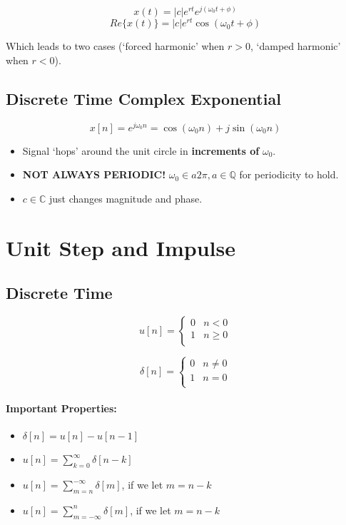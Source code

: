 \documentclass[a4paper,12pt]{report}
\begin{document}
$$x(t) = |c|e^{rt} e^{j(\omega_0 t + \phi)}$$
$$Re\{x(t)\} = |c|e^{rt} \cos(\omega_0 t + \phi)$$

Which leads to two cases (`forced harmonic' when $r>0$, `damped harmonic' when $r < 0$).

\subsection{Discrete Time Complex Exponential} 

$$x[n] = e^{j\omega_0 n} = \cos(\omega_0 n) + j\sin(\omega_0 n)$$

\begin{itemize}
\item Signal `hops' around the unit circle in \textbf{increments of} $\omega_0$.
\item \textbf{NOT ALWAYS PERIODIC!} $\omega_0 \in a2\pi, a\in \mathbb{Q}$ for periodicity to hold.
\item $c\in\mathbb{C}$ just changes magnitude and phase.
\end{itemize}

\section{Unit Step and Impulse}

\subsection{Discrete Time}

\begin{equation}
	u[n] = 
	\begin{cases}
		0 & n < 0 \\
		1 & n \geq 0 \\
	\end{cases}
\end{equation}

\begin{equation}
	\delta[n] = 
	\begin{cases}
		0 & n \neq 0 \\
		1 & n = 0 \\
	\end{cases}
\end{equation}


\paragraph{Important Properties: } 
\begin{itemize}
\item $\delta[n] = u[n] - u[n-1]$
\item $u[n] = \sum_{k=0}^\infty \delta[n-k]$
\item $u[n] = \sum_{m=n}^{-\infty} \delta[m]$, if we let $m = n-k$
\item $u[n] = \sum_{m=-\infty}^n \delta[m]$, if we let $m = n-k$
\end{itemize}
\end{document}
